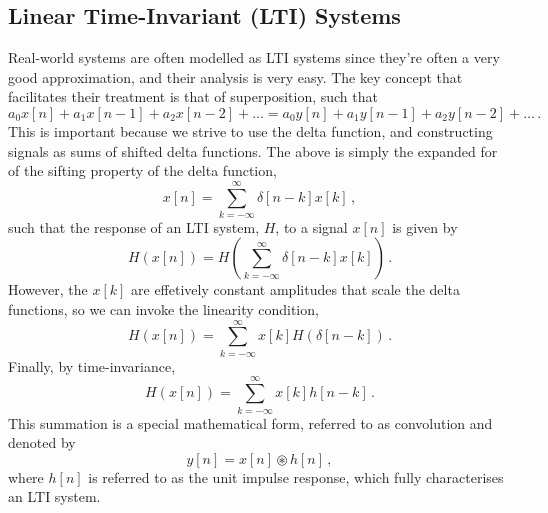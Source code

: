 \subsection{Linear Time-Invariant (LTI) Systems}
%
Real-world systems are often modelled as LTI systems since they're often a very good approximation,
and their analysis is very easy. The key concept that facilitates their treatment is that of
superposition, such that
%
\begin{equation}
  a_0x[n] + a_1x[n-1] + a_2x[n-2] + \hdots = a_0y[n] + a_1y[n-1] + a_2y[n-2] + \hdots \,.
\end{equation}
%
This is important because we strive to use the delta function, and constructing signals as
sums of shifted delta functions. The above is simply the expanded for of the sifting property
of the delta function,
%
\begin{displaymath}
  x[n] = \sum_{k=-\infty}^\infty \delta[n-k]x[k] \,,
\end{displaymath}
%
such that the response of an LTI system, $H$, to a signal $x[n]$ is given by
%
\begin{equation}
  H(x[n]) = H\left( \sum_{k=-\infty}^\infty \delta[n-k]x[k] \right) \,.
\end{equation}
%
However, the $x[k]$ are effetively constant amplitudes that scale the delta functions,
so we can invoke the linearity condition,
%
\begin{equation}
  H(x[n]) = \sum_{k=-\infty}^\infty x[k] H(\delta[n-k]) \,.
\end{equation}
%
Finally, by time-invariance,
%
\begin{equation}
  H(x[n]) = \sum_{k=-\infty}^\infty x[k] h[n-k] \,.
\end{equation}
%
This summation is a special mathematical form, referred to as convolution and denoted by
%
\begin{equation}
  y[n] = x[n] \circledast h[n] \,,
\end{equation}
%
where $h[n]$ is referred to as the unit impulse response, which fully characterises an LTI
system.
